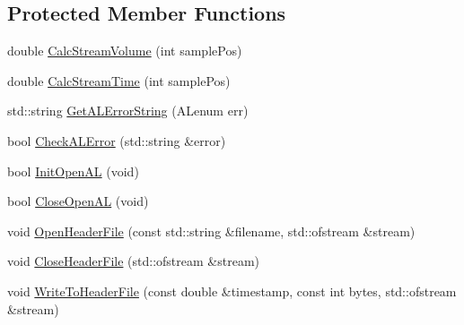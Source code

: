 \subsection*{Protected Member Functions}
\begin{DoxyCompactItemize}
\item 
double \hyperlink{classosa_open_a_l_aafcdcb9c9fcdc92d343582c108aa66eb}{Calc\+Stream\+Volume} (int sample\+Pos)
\item 
double \hyperlink{classosa_open_a_l_a0095fb1596752895e4616f0168078d26}{Calc\+Stream\+Time} (int sample\+Pos)
\item 
std\+::string \hyperlink{classosa_open_a_l_a581d019748f2a432dd3ba23fe5b7e8e2}{Get\+A\+L\+Error\+String} (A\+Lenum err)
\item 
bool \hyperlink{classosa_open_a_l_a8670f1f18f578d02e20c5d00d3b178fb}{Check\+A\+L\+Error} (std\+::string \&error)
\item 
bool \hyperlink{classosa_open_a_l_aaa5c8eba0f816c4aa0aa611856de0b44}{Init\+Open\+A\+L} (void)
\item 
bool \hyperlink{classosa_open_a_l_a4684d1c78bbb60c515b50ea3d9d37716}{Close\+Open\+A\+L} (void)
\item 
void \hyperlink{classosa_open_a_l_ab4e68f4189456499ad8c8a8346558f17}{Open\+Header\+File} (const std\+::string \&filename, std\+::ofstream \&stream)
\item 
void \hyperlink{classosa_open_a_l_aa771d6956d738469013098842d9bd8ae}{Close\+Header\+File} (std\+::ofstream \&stream)
\item 
void \hyperlink{classosa_open_a_l_ac7a1e852e98fb8e4a677707c09f6d066}{Write\+To\+Header\+File} (const double \&timestamp, const int bytes, std\+::ofstream \&stream)
\end{DoxyCompactItemize}
